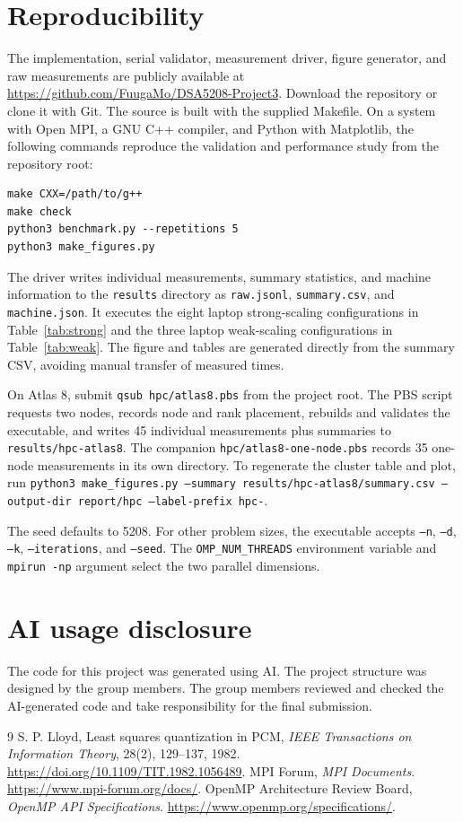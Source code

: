 \documentclass[9pt,a4paper]{extarticle}
\begin{document}
\section{Reproducibility}
The implementation, serial validator, measurement driver, figure generator, and raw measurements are publicly available at \url{https://github.com/FuugaMo/DSA5208-Project3}. Download the repository or clone it with Git. The source is built with the supplied Makefile. On a system with Open MPI, a GNU C++ compiler, and Python with Matplotlib, the following commands reproduce the validation and performance study from the repository root:
\begin{verbatim}
make CXX=/path/to/g++
make check
python3 benchmark.py --repetitions 5
python3 make_figures.py
\end{verbatim}
The driver writes individual measurements, summary statistics, and machine information to the \texttt{results} directory as \texttt{raw.jsonl}, \texttt{summary.csv}, and \texttt{machine.json}. It executes the eight laptop strong-scaling configurations in Table~\ref{tab:strong} and the three laptop weak-scaling configurations in Table~\ref{tab:weak}. The figure and tables are generated directly from the summary CSV, avoiding manual transfer of measured times.

On Atlas 8, submit \texttt{qsub hpc/atlas8.pbs} from the project root. The PBS script requests two nodes, records node and rank placement, rebuilds and validates the executable, and writes 45 individual measurements plus summaries to \texttt{results/hpc-atlas8}. The companion \texttt{hpc/atlas8-one-node.pbs} records 35 one-node measurements in its own directory. To regenerate the cluster table and plot, run \texttt{python3 make\_figures.py --summary results/hpc-atlas8/summary.csv --output-dir report/hpc --label-prefix hpc-}.

The seed defaults to 5208. For other problem sizes, the executable accepts \texttt{--n}, \texttt{--d}, \texttt{--k}, \texttt{--iterations}, and \texttt{--seed}. The \texttt{OMP\_NUM\_THREADS} environment variable and \texttt{mpirun -np} argument select the two parallel dimensions.

\section*{AI usage disclosure}
The code for this project was generated using AI. The project structure was designed by the group members. The group members reviewed and checked the AI-generated code and take responsibility for the final submission.

\begin{thebibliography}{9}
 S. P. Lloyd, Least squares quantization in PCM, \emph{IEEE Transactions on Information Theory}, 28(2), 129--137, 1982. \url{https://doi.org/10.1109/TIT.1982.1056489}.
 MPI Forum, \emph{MPI Documents}. \url{https://www.mpi-forum.org/docs/}.
 OpenMP Architecture Review Board, \emph{OpenMP API Specifications}. \url{https://www.openmp.org/specifications/}.
\end{thebibliography}
\end{document}
